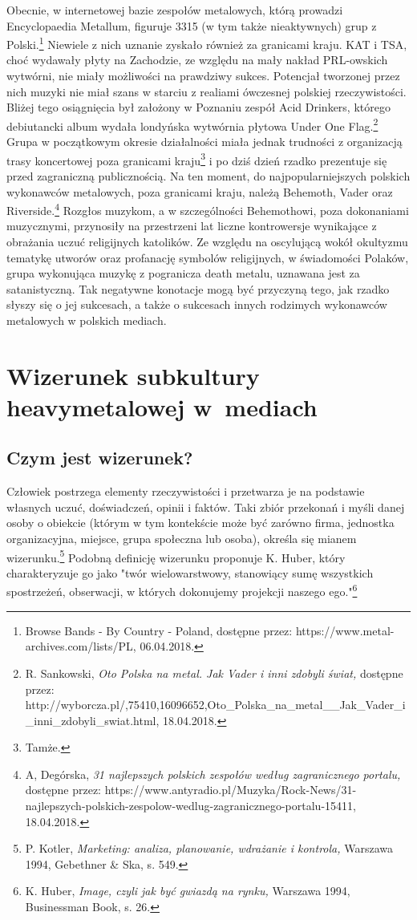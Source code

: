 \documentclass[12pt, a4paper, titlepage]{report}
\begin{document}
Obecnie, w internetowej bazie zespołów metalowych, którą prowadzi Encyclopaedia Metallum, figuruje 3315 (w tym także nieaktywnych) grup z Polski.\footnote{Browse Bands - By Country - Poland, dostępne przez: https://www.metal-archives.com/lists/PL, 06.04.2018.} Niewiele z nich uznanie zyskało również za granicami kraju. KAT i TSA, choć wydawały płyty na Zachodzie, ze względu na mały nakład PRL-owskich wytwórni, nie miały możliwości na prawdziwy sukces. Potencjał tworzonej przez nich muzyki nie miał szans w starciu z realiami ówczesnej polskiej rzeczywistości. Bliżej tego osiągnięcia był założony w Poznaniu zespół Acid Drinkers, którego debiutancki album wydała londyńska wytwórnia płytowa Under One Flag.\footnote{R. Sankowski, \textit{Oto Polska na metal. Jak Vader i inni zdobyli świat,} dostępne przez: http://wyborcza.pl/,75410,16096652,Oto_Polska_na_metal__Jak_Vader_i_inni_zdobyli_swiat.html, 18.04.2018.} Grupa w początkowym okresie działalności miała jednak trudności z organizacją trasy koncertowej poza granicami kraju\footnote{Tamże.} i po dziś dzień rzadko prezentuje się przed zagraniczną publicznością. Na ten moment, do najpopularniejszych polskich wykonawców metalowych, poza granicami kraju, należą Behemoth, Vader oraz Riverside.\footnote{A, Degórska, \textit{31 najlepszych polskich zespołów według zagranicznego portalu,} dostępne przez: https://www.antyradio.pl/Muzyka/Rock-News/31-najlepszych-polskich-zespolow-wedlug-zagranicznego-portalu-15411, 18.04.2018.} Rozgłos muzykom, a w szczególności Behemothowi, poza dokonaniami muzycznymi, przynosiły na przestrzeni lat liczne kontrowersje wynikające z obrażania uczuć religijnych katolików. Ze względu na oscylującą wokół okultyzmu tematykę utworów oraz profanację symbolów religijnych, w świadomości Polaków, grupa wykonująca muzykę z pogranicza death metalu, uznawana jest za satanistyczną. Tak negatywne konotacje mogą być przyczyną tego, jak rzadko słyszy się o jej sukcesach, a także o sukcesach innych rodzimych wykonawców metalowych w polskich mediach. 

\chapter{Wizerunek subkultury heavymetalowej w~mediach}
\section{Czym jest wizerunek?}
Człowiek postrzega elementy rzeczywistości i przetwarza je na podstawie własnych uczuć, doświadczeń, opinii i faktów. Taki zbiór przekonań i myśli danej osoby o obiekcie (którym w tym kontekście może być zarówno firma, jednostka organizacyjna, miejsce, grupa społeczna lub osoba), określa się mianem wizerunku.\footnote{P. Kotler, \textit{Marketing: analiza, planowanie, wdrażanie i kontrola,} Warszawa 1994, Gebethner \& Ska, s. 549.} Podobną definicję wizerunku proponuje K. Huber, który charakteryzuje go jako "twór wielowarstwowy, stanowiący sumę wszystkich spostrzeżeń, obserwacji, w których dokonujemy projekcji naszego ego."\footnote{K. Huber, \textit{Image, czyli jak być gwiazdą na rynku,} Warszawa 1994, Businessman Book, s. 26.} 
\end{document}
